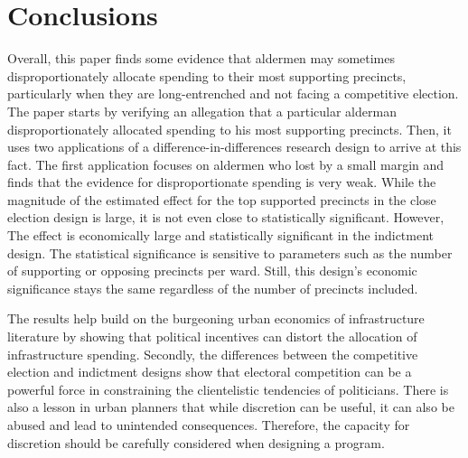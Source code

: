 \section{Conclusions}\label{sec:conclusions}

Overall, this paper finds some evidence that aldermen may sometimes disproportionately allocate spending to their most supporting precincts, particularly when they are long-entrenched and not facing a competitive election.
The paper starts by verifying an allegation that a particular alderman disproportionately allocated spending to his most supporting precincts.
Then, it uses two applications of a difference-in-differences research design to arrive at this fact.
The first application focuses on aldermen who lost by a small margin and finds that the evidence for disproportionate spending is very weak.
While the magnitude of the estimated effect for the top supported precincts in the close election design is large, it is not even close to statistically significant.
However, The effect is economically large and statistically significant in the indictment design.
The statistical significance is sensitive to parameters such as the number of supporting or opposing precincts per ward.
Still, this design's economic significance stays the same regardless of the number of
precincts included.

The results help build on the burgeoning urban economics of infrastructure literature by showing that political incentives can distort the allocation of infrastructure spending.
Secondly, the differences between the competitive election and indictment designs show that electoral competition can be a powerful force in constraining the clientelistic tendencies of politicians.
There is also a lesson in urban planners that while discretion can be useful, it can also be abused and lead to unintended consequences.
Therefore, the capacity for discretion should be carefully considered when designing a program.
